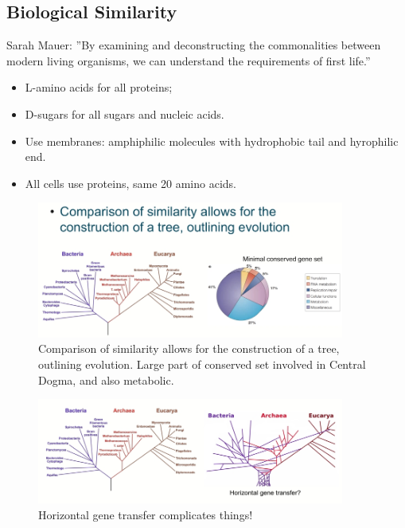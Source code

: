 \documentclass[]{article}
\begin{document}
\subsection{Biological Similarity}

Sarah Mauer: ''By examining and deconstructing the commonalities between modern living organisms, we can understand the requirements of first life.''

\begin{itemize}
	\item L-amino acids for all proteins;
	\item D-sugars for all sugars and nucleic acids.
	\item Use membranes: amphiphilic molecules with hydrophobic tail and hyrophilic end.
	\item All cells use proteins, same 20 amino acids.
\end{itemize}

\begin{figure}[H]
	\caption{Comparison of similarity allows for the
		construction of a tree, outlining evolution. Large part of conserved set involved in Central Dogma, and also metabolic.}\label{fig:Phylogeny} 
	\includegraphics[width=0.9\textwidth]{Phylogeny}
\end{figure}

\begin{figure}[H]
	\caption{Horizontal gene transfer complicates things!}\label{fig:PhylogenyHorizontal} 
	\includegraphics[width=0.9\textwidth]{PhylogenyHorizontal}
\end{figure}
\end{document}

